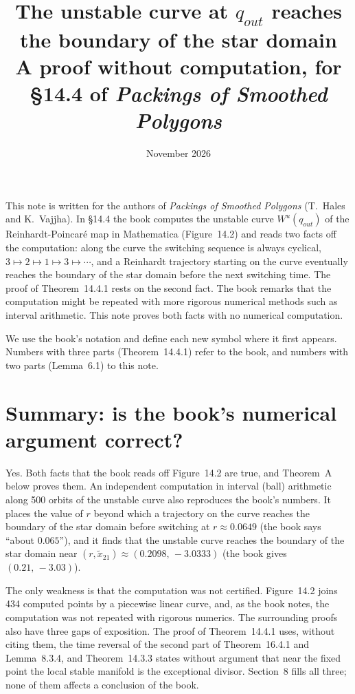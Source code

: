 \documentclass[11pt,a4paper]{article}
\title{The unstable curve at $q_{out}$ reaches the boundary of the star domain\\[4pt]
\large A proof without computation, for \S14.4 of \emph{Packings of Smoothed Polygons}}
\author{}
\date{November 2026}
\theoremstyle{plain}
\theoremstyle{definition}
\theoremstyle{remark}
\begin{document}
\maketitle

\noindent
This note is written for the authors of \emph{Packings of Smoothed Polygons} (T.~Hales and
K.~Vajjha). In \S14.4 the book computes the unstable curve $W^u(q_{out})$ of the
Reinhardt-Poincar\'e map in Mathematica (Figure~14.2) and reads two facts off the computation:
along the curve the switching sequence is always cyclical, $3\mapsto2\mapsto1\mapsto3\mapsto\cdots$,
and a Reinhardt trajectory starting on the curve eventually reaches the boundary of the star domain
before the next switching time. The proof of Theorem~14.4.1 rests on the second fact. The book
remarks that the computation might be repeated with more rigorous numerical methods such as
interval arithmetic. This note proves both facts with no numerical computation.

We use the book's notation and define each new symbol where it first appears. Numbers with
three parts (Theorem~14.4.1) refer to the book, and numbers with two parts (Lemma~6.1) to this
note.

\section*{Summary: is the book's numerical argument correct?}

Yes. Both facts that the book reads off Figure~14.2 are true, and Theorem~A below proves them. An
independent computation in interval (ball) arithmetic along 500 orbits of the unstable curve also
reproduces the book's numbers. It places the value of $r$ beyond which a trajectory on the curve
reaches the boundary of the star domain before switching at $r\approx0.0649$ (the book says
``about $0.065$''), and it finds that the unstable curve reaches the boundary of the star domain
near $(r,\tilde x_{21})\approx(0.2098,\,-3.0333)$ (the book gives $(0.21,\,-3.03)$).

The only weakness is that the computation was not certified. Figure~14.2 joins 434 computed
points by a piecewise linear curve, and, as the book notes, the computation was not repeated with
rigorous numerics. The surrounding proofs also have three gaps of exposition. The proof of
Theorem~14.4.1 uses, without citing them, the time reversal of the second part of
Theorem~16.4.1 and Lemma~8.3.4, and Theorem~14.3.3 states without argument that near the fixed
point the local stable manifold is the exceptional divisor. Section~8 fills all three; none of
them affects a conclusion of the book.
\end{document}
